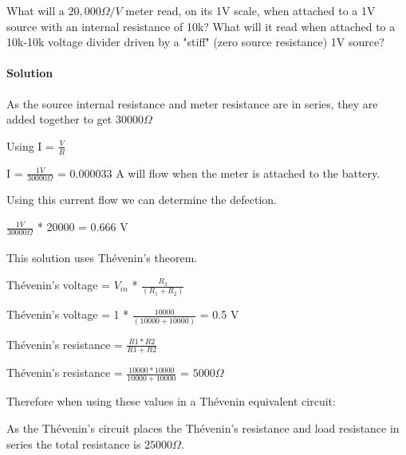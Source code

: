 \documentclass[a4paper, 12pt]{article}
\begin{document}
What will a $20,000\Omega/V$ meter read, on its 1V scale, when attached to a 1V source with an internal resistance of 10k? What will it read when attached to a 10k-10k voltage divider driven by a "stiff" (zero source resistance) 1V source?

\paragraph{Solution\newline}

As the source internal resistance and meter resistance are in series, they are added together to get $30000\Omega$\newline

Using I = $\frac{V}{R}$\newline

I = $\frac{1 V}{30000\Omega}$ = 0.000033 A will flow when the meter is attached to the battery.\newline

Using this current flow we can determine the defection.\newline

$\frac{1 V}{30000\Omega}$ * 20000 = 0.666 V\newline

\paragraph{\newline}

This solution uses Th\'{e}venin's theorem.\newline

Th\'{e}venin's voltage = $V_{in}$ * $\frac{R_2}{(R_1+R_2)}$\newline

Th\'{e}venin's voltage = 1 * $\frac{10000}{(10000+10000)}$ = 0.5 V\newline

Th\'{e}venin's resistance = $\frac{R1*R2}{R1+R2}$\newline

Th\'{e}venin's resistance = $\frac{10000*10000}{10000+10000}$ = $5000\Omega$\newline

Therefore when using these values in a Th\'{e}venin equivalent circuit:\newline

As the Th\'{e}venin's circuit places the Th\'{e}venin's resistance and load resistance in series the total resistance is $25000\Omega$.\newline
\end{document}
